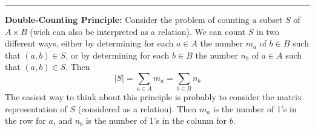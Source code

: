 \documentclass[a4paper]{extarticle}
\newcommand{\Com}{\textbf{Com.}\ }
\newcommand{\sep}{\vspace{5pt}\noindent\hrule\vspace{5pt}}
\begin{document}
\begin{multicols*}{2}
\begin{table}[H]
\end{table}

\sep

\textbf{Double-Counting Principle:} Consider the problem of counting a
subset $S$ of $A\times B$ (wich can also be interpreted as a relation). We can
count $S$ in two different ways, either by determining for each $a\in A$ the
number $m_a$ of $b\in B$ such that $(a,b)\in S$, or by determining for each
$b\in B$ the number $n_b$ of $a\in A$ such that $(a,b)\in S$. Then
\[
|S|=\sum_{a\in A}m_a = \sum_{b\in B}n_b
\]
The easiest way to think about this principle is probably to consider the matrix
representation of $S$ (considered as a relation). Then $m_a$ is the number of
1's in the row for $a$, and $n_b$ is the number of 1's in the column for $b$.

\end{multicols*}
\end{document}
